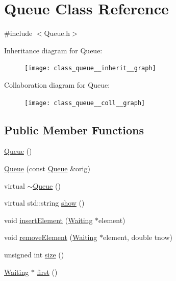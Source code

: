 \hypertarget{class_queue}{\section{Queue Class Reference}
\label{class_queue}
}


{\ttfamily \#include $<$Queue.\-h$>$}



Inheritance diagram for Queue\-:\nopagebreak
\begin{figure}[H]
\begin{center}
\leavevmode
\texttt{[image: class\_queue\_\_inherit\_\_graph]}
\end{center}
\end{figure}


Collaboration diagram for Queue\-:\nopagebreak
\begin{figure}[H]
\begin{center}
\leavevmode
\texttt{[image: class\_queue\_\_coll\_\_graph]}
\end{center}
\end{figure}
\subsection*{Public Member Functions}
\begin{DoxyCompactItemize}
\item 
\hyperlink{class_queue_a7cfca3637d57c4a9e37351b3426ffd40}{Queue} ()
\item 
\hyperlink{class_queue_a09f908d6edb810d86871bda50fdf4bac}{Queue} (const \hyperlink{class_queue}{Queue} \&orig)
\item 
virtual \hyperlink{class_queue_a00d119db8fa3050da37746e82cbcf94f}{$\sim$\-Queue} ()
\item 
virtual std\-::string \hyperlink{class_queue_ac78cc84cd91539c7f38d95dc17dabac5}{show} ()
\item 
void \hyperlink{class_queue_a961b5b7ca80317aa69f958612fb988ad}{insert\-Element} (\hyperlink{class_waiting}{Waiting} $\ast$element)
\item 
void \hyperlink{class_queue_a114d5144b3026b57cca9cf481b1f0d65}{remove\-Element} (\hyperlink{class_waiting}{Waiting} $\ast$element, double tnow)
\item 
unsigned int \hyperlink{class_queue_a4cd92f99b7abc9ec4df32690dc5a037d}{size} ()
\item 
\hyperlink{class_waiting}{Waiting} $\ast$ \hyperlink{class_queue_a39a1f5a1733f61634339ecee7aac7907}{first} ()
\end{DoxyCompactItemize}
